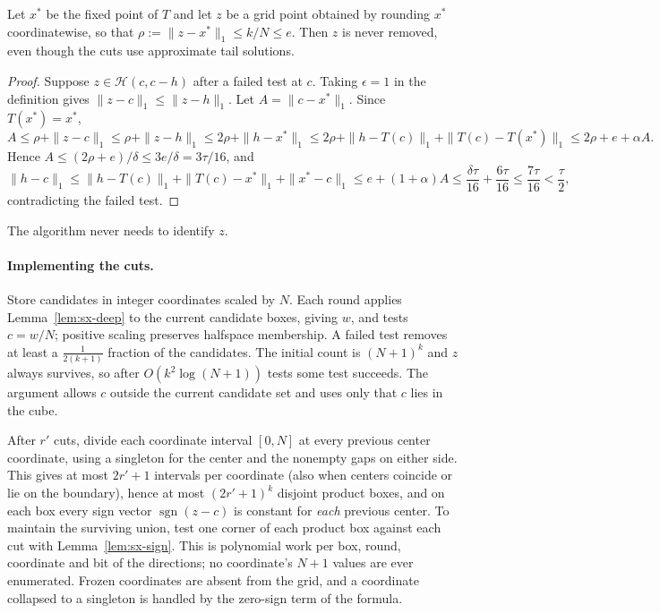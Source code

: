 \begin{lemma}\label{lem:sx-protect}
Let $x^*$ be the fixed point of $T$ and let $z$ be a grid point obtained by rounding $x^*$
coordinatewise, so that $\rho:=\|z-x^*\|_1\le k/N\le e$. Then $z$ is never removed, even though the cuts
use approximate tail solutions.
\end{lemma}

\begin{proof}
Suppose $z\in\mathcal H(c,c-h)$ after a failed test at $c$. Taking $\epsilon=1$ in the definition gives
$\|z-c\|_1\le\|z-h\|_1$. Let $A=\|c-x^*\|_1$. Since $T(x^*)=x^*$,
\[
  A\le\rho+\|z-c\|_1\le\rho+\|z-h\|_1\le2\rho+\|h-x^*\|_1\le2\rho+\|h-T(c)\|_1+\|T(c)-T(x^*)\|_1\le2\rho+e+\alpha A .
\]
Hence $A\le(2\rho+e)/\delta\le3e/\delta=3\tau/16$, and
\[
  \|h-c\|_1\le\|h-T(c)\|_1+\|T(c)-x^*\|_1+\|x^*-c\|_1\le e+(1+\alpha)A\le\frac{\delta\tau}{16}+\frac{6\tau}{16}
  \le\frac{7\tau}{16}<\frac\tau2,
\]
contradicting the failed test.
\end{proof}

The algorithm never needs to identify $z$.

\paragraph{Implementing the cuts.} Store candidates in integer coordinates scaled by $N$. Each round
applies Lemma~\ref{lem:sx-deep} to the current candidate boxes, giving $w$, and tests $c=w/N$; positive
scaling preserves halfspace membership. A failed test removes at least a $\frac1{2(k+1)}$ fraction of the
candidates. The initial count is $(N+1)^k$ and $z$ always survives, so after $O(k^2\log(N+1))$ tests some
test succeeds. The argument allows $c$ outside the current candidate set and uses only that $c$ lies in
the cube.

After $r'$ cuts, divide each coordinate interval $[0,N]$ at every previous center coordinate, using a
singleton for the center and the nonempty gaps on either side. This gives at most $2r'+1$ intervals per
coordinate (also when centers coincide or lie on the boundary), hence at most $(2r'+1)^k$ disjoint
product boxes, and on each box every sign vector $\operatorname{sgn}(z-c)$ is constant for \emph{each}
previous center. To maintain the surviving union, test one corner of each product box against each cut
with Lemma~\ref{lem:sx-sign}. This is polynomial work per box, round, coordinate and bit of the
directions; no coordinate's $N+1$ values are ever enumerated. Frozen coordinates are absent from the
grid, and a coordinate collapsed to a singleton is handled by the zero-sign term of the formula.

